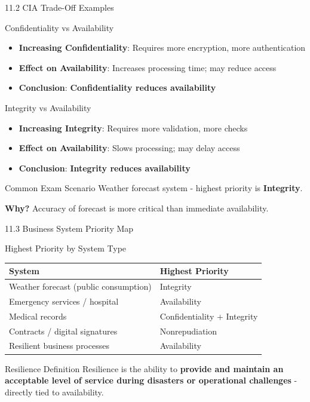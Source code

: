 \documentclass{beamer}
\begin{document}
	\begin{frame}{11.2 CIA Trade-Off Examples}
		\begin{block}{Confidentiality vs Availability}
			\begin{itemize}
				\item \textbf{Increasing Confidentiality}: Requires more encryption, more authentication
				\item \textbf{Effect on Availability}: Increases processing time; may reduce access
				\item \textbf{Conclusion}: \textbf{Confidentiality reduces availability}
			\end{itemize}
		\end{block}
		
		\begin{block}{Integrity vs Availability}
			\begin{itemize}
				\item \textbf{Increasing Integrity}: Requires more validation, more checks
				\item \textbf{Effect on Availability}: Slows processing; may delay access
				\item \textbf{Conclusion}: \textbf{Integrity reduces availability}
			\end{itemize}
		\end{block}
		
		\begin{exampleblock}{Common Exam Scenario}
			Weather forecast system - highest priority is \textbf{Integrity}.
			
			\textbf{Why?} Accuracy of forecast is more critical than immediate availability.
		\end{exampleblock}
	\end{frame}
	
	\begin{frame}{11.3 Business System Priority Map}
		\begin{block}{Highest Priority by System Type}
			\begin{tabular}{|p{5cm}|p{3.5cm}|}
				\hline
				\textbf{System} & \textbf{Highest Priority} \\
				\hline
				Weather forecast (public consumption) & Integrity \\
				\hline
				Emergency services / hospital & Availability \\
				\hline
				Medical records & Confidentiality + Integrity \\
				\hline
				Contracts / digital signatures & Nonrepudiation \\
				\hline
				Resilient business processes & Availability \\
				\hline
			\end{tabular}
		\end{block}
		
		\begin{alertblock}{Resilience Definition}
			Resilience is the ability to \textbf{provide and maintain an acceptable level of service during disasters or operational challenges} - directly tied to availability.
		\end{alertblock}
	\end{frame}
	
\end{document}
